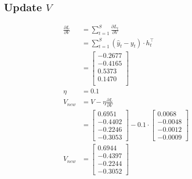 \documentclass{article}
\begin{document}
\subsection{Update $V$}
\begin{align*} 
\frac{\partial L}{\partial V} &= \sum_{t=1}^{S} \frac{\partial L_{t}}{\partial V} \\
&=\sum_{t=1}^{S} (\hat{y}_{t} - y_{t}) \cdot h_{t}^\top\\
&= \begin{bmatrix}
-0.2677 \\
-0.4165 \\
0.5373 \\
0.1470 \\
\end{bmatrix}\\
\eta &= 0.1\\
V_{new} &= V - \eta \frac{\partial L}{\partial V}\\
 &= \begin{bmatrix}
  0.6951 \\
 -0.4402 \\
 -0.2246 \\
 -0.3053
\end{bmatrix} - 0.1 \cdot\begin{bmatrix}
 0.0068 \\
-0.0048 \\
-0.0012 \\
-0.0009
\end{bmatrix} \\
V_{new} &= \begin{bmatrix}
0.6944 \\
-0.4397 \\
-0.2244 \\
-0.3052
\end{bmatrix}
\end{align*}
\end{document}
